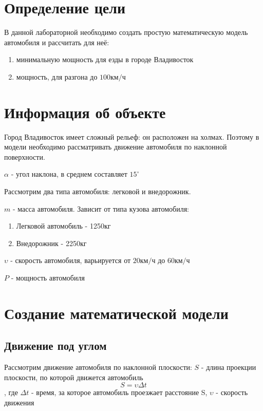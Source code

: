 \documentclass[a4paper, 14pt]{extarticle}
\begin{document}
	\pagebreak	

	\section{Определение цели}
		В данной лабораторной необходимо создать простую математическую модель автомобиля и рассчитать для неё:
		\begin{enumerate}[leftmargin=3\parindent, itemsep=0mm]
			\item минимальную мощность для езды в городе Владивосток
			\item мощность, для разгона до \(100 \text{км}/\text{ч} \)
		\end{enumerate}

	\section{Информация об объекте}
		Город Владивосток имеет сложный рельеф: он расположен на холмах. Поэтому в модели необходимо рассматривать движение автомобиля по наклонной поверхности.
		
		\(\alpha \) - угол наклона, в среднем составляет \( 15 ^\circ \)
		
		Рассмотрим два типа автомобиля: легковой и внедорожник.
		
		\( m \) - масса автомобиля. Зависит от типа кузова автомобиля:
		\begin{enumerate}[leftmargin=3\parindent, itemsep=0mm]
			\item Легковой автомобиль - 1250кг
			\item Внедорожник - 2250кг
		\end{enumerate}

		\( \upsilon \) - скорость автомобиля, варьируется от \(20 \text{км}/\text{ч} \) до \(60 \text{км}/\text{ч} \) 
		
		\( P \) - мощность автомобиля

	\section{Создание математической модели}
		\subsection{Движение под углом}
			Рассмотрим движение автомобиля по наклонной плоскости:
			\( S \) - длина проекции плоскости, по которой движется автомобиль
			\[ S = \upsilon \Delta t \tag{3.1.1} \label{eq:special} \]
			, где \( \Delta t \) - время, за которое автомобиль проезжает расстояние S,
			\( \upsilon \) - скорость движения
	
\end{document}
